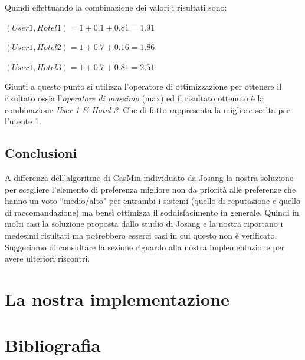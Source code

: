 \documentclass[letterpaper]{article} %
\begin{document}
Quindi effettuando la combinazione dei valori i risultati sono:
\newline

$(User1 , Hotel 1) = 1 + 0.1 + 0.81 = 1.91$

$(User 1, Hotel 2) = 1 + 0.7 + 0.16 = 1.86$

$(User 1, Hotel 3) = 1 + 0.7 + 0.81 = 2.51$
\newline

Giunti a questo punto si utilizza l'operatore di ottimizzazione per
ottenere il risultato ossia l'\emph{operatore di massimo} (max) ed il
risultato ottenuto è la combinazione \emph{User 1 \& Hotel 3}. Che di
fatto rappresenta la migliore scelta per l'utente 1.

\hypertarget{header-n280}{%
	\subsection{Conclusioni}\label{header-n280}}

A differenza dell'algoritmo di CasMin individuato da Josang la nostra
soluzione per scegliere l'elemento di preferenza migliore non da
priorità alle preferenze che hanno un voto ``medio/alto" per entrambi i
sistemi (quello di reputazione e quello di raccomandazione) ma bensì
ottimizza il soddisfacimento in generale. Quindi in molti casi la
soluzione proposta dallo studio di Josang e la nostra riportano i
medesimi risultati ma potrebbero esserci casi in cui questo non è
verificato. Suggeriamo di consultare la sezione riguardo alla nostra
implementazione per avere ulteriori riscontri.

\hypertarget{header-n284}{%
	\section{La nostra implementazione}\label{header-n284}}

\hypertarget{header-n287}{%
	\section{Bibliografia}\label{header-n287}}
\end{document}
